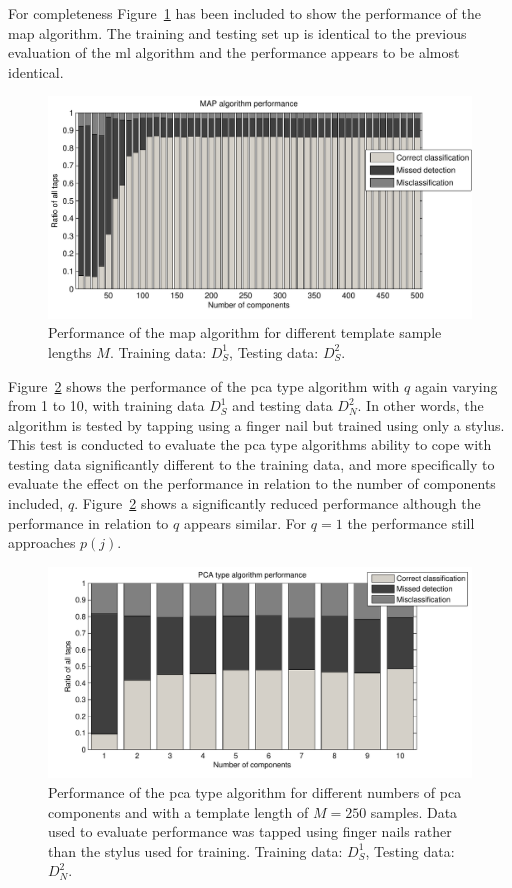 For completeness Figure~\ref{fig:MAPperformLength} has been included to show the performance of the \gls{map} algorithm. The training and testing set up is identical to the previous evaluation of the \gls{ml} algorithm and the performance appears to be almost identical.

\begin{figure}[!] %
\centering
\includegraphics[width=150mm]{MAPperformLength.pdf}
\caption{Performance of the \gls{map} algorithm for different template sample lengths $M$. Training data: $D^1_S$, Testing data: $D^2_S$.}\label{fig:MAPperformLength}
\end{figure}

Figure~\ref{fig:PCAperformNail} shows the performance of the \gls{pca} type algorithm with $q$ again varying from 1 to 10, with training data $D^1_S$ and testing data $D^2_N$. In other words, the algorithm is tested by tapping using a finger nail but trained using only a stylus. This test is conducted to evaluate the \gls{pca} type algorithms ability to cope with testing data significantly different to the training data, and more specifically to evaluate the effect on the performance in relation to the number of components included, $q$. Figure~\ref{fig:PCAperformNail} shows a significantly reduced performance although the performance in relation to $q$ appears similar. For $q=1$ the performance still approaches $p(j)$.

\begin{figure}[!] %
\centering
\includegraphics[width=150mm]{PCAperformNail.pdf}
\caption{Performance of the \gls{pca} type algorithm for different numbers of \gls{pca} components and with a template length of $M=250$ samples. Data used to evaluate performance was tapped using finger nails rather than the stylus used for training. Training data: $D^1_S$, Testing data: $D^2_N$.}\label{fig:PCAperformNail}
\end{figure}

